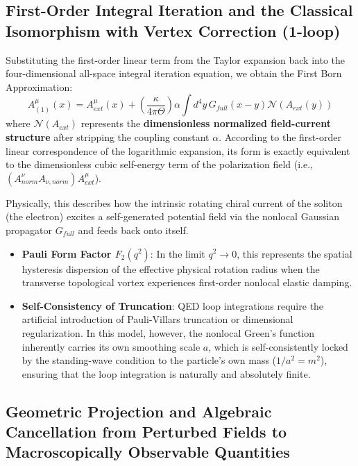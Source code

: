 \documentclass[12pt, a4paper]{article}
\begin{document}
\subsection{First-Order Integral Iteration and the Classical Isomorphism with Vertex Correction (1-loop)}

Substituting the first-order linear term from the Taylor expansion back into the four-dimensional all-space integral iteration equation, we obtain the First Born Approximation:
\begin{equation}
A_{(1)}^\mu(x) = A_{ext}^\mu(x) + \left( \frac{\kappa}{4\pi\Theta} \right) \alpha \int d^4y \, G_{full}(x - y) \mathcal{N}\left(A_{ext}(y)\right)
\end{equation}
where $\mathcal{N}(A_{ext})$ represents the \textbf{dimensionless normalized field-current structure} after stripping the coupling constant $\alpha$. According to the first-order linear correspondence of the logarithmic expansion, its form is exactly equivalent to the dimensionless cubic self-energy term of the polarization field (i.e., $(A^{\nu}_{norm} A_{\nu, norm}) A^\mu_{ext}$).

Physically, this describes how the intrinsic rotating chiral current of the soliton (the electron) excites a self-generated potential field via the nonlocal Gaussian propagator $G_{full}$ and feeds back onto itself.
\begin{itemize}
    \item \textbf{Pauli Form Factor $F_2(q^2)$}: In the limit $q^2 \to 0$, this represents the spatial hysteresis dispersion of the effective physical rotation radius when the transverse topological vortex experiences first-order nonlocal elastic damping.
    \item \textbf{Self-Consistency of Truncation}: QED loop integrations require the artificial introduction of Pauli-Villars truncation or dimensional regularization. In this model, however, the nonlocal Green's function inherently carries its own smoothing scale $a$, which is self-consistently locked by the standing-wave condition to the particle's own mass ($1/a^2 = m^2$), ensuring that the loop integration is naturally and absolutely finite.
\end{itemize}

\subsection{Geometric Projection and Algebraic Cancellation from Perturbed Fields to Macroscopically Observable Quantities}
\end{document}
